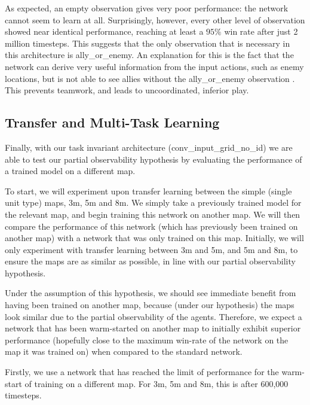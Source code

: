 As expected, an empty observation gives very poor performance: the network cannot seem to learn at all. Surprisingly, however, every other level of observation showed near identical performance, reaching at least a $95\%$ win rate after just 2 million timesteps. This suggests that the only observation that is necessary in this architecture is ally\_or\_enemy. An explanation for this is the fact that the network can derive very useful information from the input actions, such as enemy locations, but is not able to see allies without the ally\_or\_enemy observation . This prevents teamwork, and leads to uncoordinated, inferior play. 










\subsection{Transfer and Multi-Task Learning}

Finally, with our task invariant architecture (conv\_input\_grid\_no\_id) we are able to test our partial observability hypothesis by evaluating the performance of a trained model on a different map.

To start, we will experiment upon transfer learning between the simple (single unit type) maps, 3m, 5m and 8m. We simply take a previously trained model for the relevant map, and begin training this network on another map. We will then compare the performance of this network (which has previously been trained on another map) with a network that was only trained on this map. Initially, we will only experiment with transfer learning between 3m and 5m, and 5m and 8m, to ensure the maps are as similar as possible, in line with our partial observability hypothesis.

Under the assumption of this hypothesis, we should see immediate benefit from having been trained on another map, because (under our hypothesis) the maps look similar due to the partial observability of the agents. Therefore, we expect a network that has been warm-started on another map to initially exhibit superior performance (hopefully close to the maximum win-rate of the network on the map it was trained on) when compared to the standard network.


Firstly, we use a network that has reached the limit of performance for the warm-start of training on a different map. For 3m, 5m and 8m, this is after 600,000 timesteps.


